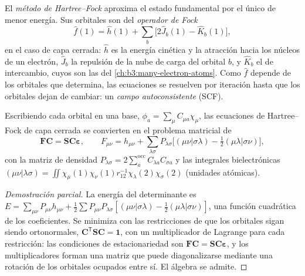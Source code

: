 \begin{definition}\label{def:b3:computational-chemistry:hartree-fock}
El \emph{método de Hartree--Fock} aproxima el
estado fundamental por el  único de menor energía. Sus orbitales
son  del \emph{operador de Fock}
\[
\hat f(1) = \hat h(1) + \sum_b\big[2\hat J_b(1) - \hat K_b(1)\big],
\]
en el caso de capa cerrada: $\hat h$ es la energía cinética y la atracción hacia los
núcleos de un electrón, $\hat J_b$ la repulsión de la nube de carga del
orbital $b$, y $\hat K_b$ el  de intercambio, cuyos  son
las  del \cref{ch:b3:many-electron-atoms}. Como $\hat f$
depende de los orbitales que determina, las ecuaciones se resuelven por
iteración hasta que los orbitales dejan de cambiar: un \emph{campo
autoconsistente} (SCF).
\end{definition}

\begin{theorem}\label{thm:b3:computational-chemistry:roothaan}
Escribiendo cada orbital en una base, $\phi_a = \sum_\mu C_{\mu a}\chi_\mu$, las
ecuaciones de Hartree--Fock de capa cerrada se convierten en el problema matricial de 
\[
\mathbf F\mathbf C = \mathbf S\mathbf C\boldsymbol\varepsilon, \qquad F_{\mu\nu} =
h_{\mu\nu} + \sum_{\lambda\sigma}P_{\lambda\sigma}\big[(\mu\nu|\sigma\lambda) -
\tfrac12(\mu\lambda|\sigma\nu)\big],
\]
con la matriz de densidad $P_{\lambda\sigma} = 2\sum_a^{\mathrm{occ}}C_{\lambda a}C_{\sigma
a}$ y las integrales bielectrónicas $(\mu\nu|\lambda\sigma) = \iint\chi_\mu(1)\chi_\nu(1)
r_{12}^{-1}\chi_\lambda(2)\chi_\sigma(2)$ (unidades atómicas).
\end{theorem}

\begin{proof}[Demostración parcial]
La energía del determinante es $E = \sum_{\mu\nu}P_{\mu\nu}h_{\mu\nu} + \frac12
\sum P_{\mu\nu}P_{\lambda\sigma}[(\mu\nu|\sigma\lambda) - \frac12(\mu\lambda|\sigma\nu)]$, una
función cuadrática de los coeficientes. Se minimiza con las restricciones
de que los orbitales sigan siendo ortonormales, $\mathbf C^{\mathsf T}\mathbf S\mathbf C = \mathbf 1$,
con un multiplicador de Lagrange para cada restricción: las condiciones de
estacionariedad son $\mathbf F\mathbf C = \mathbf S\mathbf C\boldsymbol\varepsilon$, y los
multiplicadores forman una matriz que puede diagonalizarse mediante una rotación de los
orbitales ocupados entre sí. El álgebra se admite.
\end{proof}

